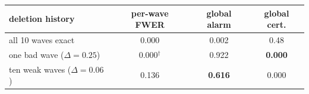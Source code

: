 \begin{tabular}{lccc}
\toprule
deletion history & per-wave FWER & global alarm & global cert.\\
\midrule
all 10 waves exact & 0.000 & 0.002 & 0.48\\
one bad wave ($\Delta=0.25$) & 0.000$^{\dagger}$ & 0.922 & \textbf{0.000}\\
ten weak waves ($\Delta=0.06$) & 0.136 & \textbf{0.616} & 0.000\\
\bottomrule
\end{tabular}
